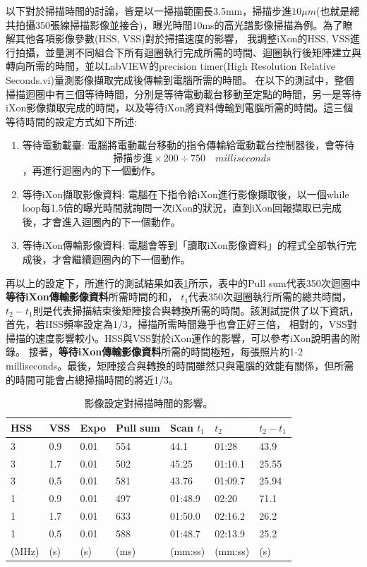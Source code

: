 \documentclass[12pt]{article}
\begin{document}
以下對於掃描時間的討論，皆是以一掃描範圍長3.5mm，掃描步進$10\mu m$(也就是總共拍攝350張線掃描影像並接合)，曝光時間10ms的高光譜影像掃描為例。為了瞭解其他各項影像參數(HSS, VSS)對於掃描速度的影響，
我調整iXon的HSS, VSS進行拍攝，並量測不同組合下所有迴圈執行完成所需的時間、迴圈執行後矩陣建立與轉向所需的時間，並以LabVIEW的precision timer(High Resolution Relative Seconds.vi)量測影像擷取完成後傳輸到電腦所需的時間。
在以下的測試中，整個掃描迴圈中有三個等待時間，分別是等待電動載台移動至定點的時間，另一是等待iXon影像擷取完成的時間，以及等待iXon將資料傳輸到電腦所需的時間。這三個等待時間的設定方式如下所述:
\begin{enumerate}
    \item 等待電動載臺: 電腦將電動載台移動的指令傳輸給電動載台控制器後，會等待\begin{equation} \label{eq: stageWait}
              \text{掃描步進}\times 200 \div 750 \quad milliseconds
          \end{equation}，再進行迴圈內的下一個動作。
    \item 等待iXon擷取影像資料: 電腦在下指令給iXon進行影像擷取後，以一個while loop每1.5倍的曝光時間就詢問一次iXon的狀況，直到iXon回報擷取已完成後，才會進入迴圈內的下一個動作。
    \item 等待iXon傳輸影像資料: 電腦會等到「讀取iXon影像資料」的程式全部執行完成後，才會繼續迴圈內的下一個動作。
\end{enumerate}
再以上的設定下，所進行的測試結果如表\ref{tab: measuring}所示，表中的Pull sum代表350次迴圈中\textbf{等待iXon傳輸影像資料}所需時間的和，
$t_1$代表350次迴圈執行所需的總共時間，$t_2-t_1$則是代表掃描結束後矩陣接合與轉換所需的時間。該測試提供了以下資訊，首先，若HSS頻率設定為1/3，掃描所需時間幾乎也會正好三倍，
相對的，VSS對掃描的速度影響較小。HSS與VSS對於iXon運作的影響，可以參考iXon說明書的附錄。\cite{ixonManual}
接著，\textbf{等待iXon傳輸影像資料}所需的時間極短，每張照片約1-2 milliseconds。最後，矩陣接合與轉換的時間雖然只與電腦的效能有關係，但所需的時間可能會占總掃描時間的將近1/3。
\begin{table}[]
    \centering
    \begin{tabular}{lll||llll}
        HSS   & VSS & Expo & Pull sum & Scan $t_1$ & $t_2$   & $t_2-t_1$ \\ \hline \hline
        3     & 0.9 & 0.01 & 554      & 44.1       & 01:28   & 43.9      \\ \hline
        3     & 1.7 & 0.01 & 502      & 45.25      & 01:10.1 & 25.55     \\ \hline
        3     & 0.5 & 0.01 & 581      & 43.76      & 01:09.7 & 25.94     \\ \hline
        1     & 0.9 & 0.01 & 497      & 01:48.9    & 02:20   & 71.1      \\ \hline
        1     & 1.7 & 0.01 & 633      & 01:50.0    & 02:16.2 & 26.2      \\ \hline
        1     & 0.5 & 0.01 & 588      & 01:48.7    & 02:13.9 & 25.2      \\
        (MHz) & (s) & (s)  & (ms)     & (mm:ss)    & (mm:ss) & (s)
    \end{tabular}
    \label{tab: measuring}
    \caption{影像設定對掃描時間的影響。}
\end{table}
\end{document}
